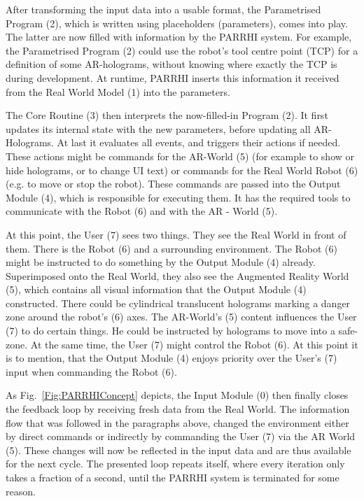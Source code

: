 After transforming the input data into a usable format, the Parametrised Program (2), which is written using placeholders (parameters), comes into play. The latter are now filled with information by the PARRHI system. For example, the Parametrised Program (2) could use the robot's tool centre point (TCP) for a definition of some AR-holograms, without knowing where exactly the TCP is during development. At runtime, PARRHI inserts this information it received from the Real World Model (1) into the parameters. 

The Core Routine (3) then interprets the now-filled-in Program (2). It first updates its internal state with the new parameters, before updating all AR-Holograms. At last it evaluates all events, and triggers their actions if needed. These actions might be commands for the AR-World (5) (for example to show or hide holograms, or to change UI text) or commands for the Real World Robot (6) (e.g. to move or stop the robot). These commands are passed into the Output Module (4), which is responsible for executing them. It has the required tools to communicate with the Robot (6) and with the AR - World (5). 

At this point, the User (7) sees two things. They see the Real World in front of them. There is the Robot (6) and a surrounding environment. The Robot (6) might be instructed to do something by the Output Module (4) already. Superimposed onto the Real World, they also see the Augmented Reality World (5), which contains all visual information that the Output Module (4) constructed. There could be cylindrical translucent holograms marking a danger zone around the robot's (6) axes. The AR-World's (5) content influences the User (7) to do certain things. He could be instructed by holograms to move into a safe-zone. At the same time, the User (7) might control the Robot (6). At this point it is to mention, that the Output Module (4) enjoys priority over the User's (7) input when commanding the Robot (6).

As Fig.~\ref{Fig:PARRHIConcept} depicts, the Input Module (0) then finally closes the feedback loop by receiving fresh data from the Real World. The information flow that was followed in the paragraphs above, changed the environment either by direct commands or indirectly by commanding the User (7) via the AR World (5). These changes will now be reflected in the input data and are thus available for the next cycle. The presented loop repeats itself, where every iteration only takes a fraction of a second, until the PARRHI system is terminated for some reason. 

